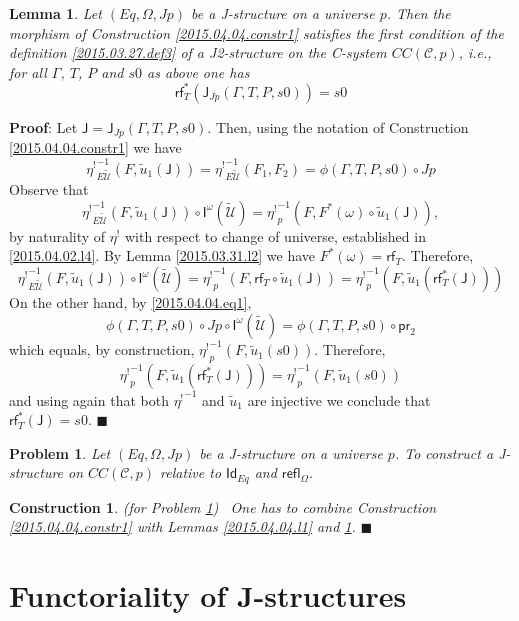 \documentclass[12pt]{article}
\numberwithin{equation}{section}
\newenvironment{myproof}{{\bf Proof}:}{$\blacksquare$ \vskip 5mm }
\newtheorem{lemma}[proposition]{Lemma}
\newtheorem{problem}[proposition]{Problem}
\newtheorem{construction0}[proposition]{Construction}
\newenvironment{construction}[1]{\begin{construction0}(for Problem \ref{#1})\ }{$\blacksquare$ \end{construction0}}
\newcommand{\wt}{\widetilde}
\newcommand{\toCC}{CC} %
\newcommand{\C}{{\mathcal C}}  %
\newcommand{\Id}{\mathsf{Id}} %
\newcommand{\refl}{\mathsf{refl}}
\newcommand{\J}{\mathsf{J}}
\newcommand{\U}{\mathcal{U}}
\newcommand{\I}{\mathsf{I}}
\newcommand{\rf}{\mathsf{rf}}
\newcommand{\etashriek}{\eta^!}
\newcommand{\etaunshriek}{{\etashriek}^{-1}}
\newcommand{\pr}{\mathsf{pr}}
\begin{document}
%
\begin{lemma}
\label{2015.04.04.l5} Let $(Eq,\Omega,Jp)$ be a J-structure on a universe
$p$. Then the morphism of Construction \ref{2015.04.04.constr1} satisfies the
first condition of the definition \ref{2015.03.27.def3} of a J2-structure on the C-system $\toCC({\C},p)$, i.e., for all $\Gamma$,
$T$, $P$ and $s0$ as above one has
%
$$\rf_T^*(\J_{Jp}(\Gamma,T,P,s0))=s0$$
%
\end{lemma}
%
\begin{myproof}
Let $\J=\J_{Jp}(\Gamma,T,P,s0)$. Then, using the notation of Construction
\ref{2015.04.04.constr1} we have
%
$$\etaunshriek_{E\wt{\U}}(F,\wt{u}_1(\J)) = \etaunshriek_{E\wt{\U}}(F_1,F_2) =\phi(\Gamma,T,P,s0)\circ Jp$$
%
Observe that
%
$$\etaunshriek_{E\wt{\U}}(F,\wt{u}_1(\J))\circ
\I^{\omega}(\wt{\U})=\etaunshriek_p(F,F^*(\omega)\circ \wt{u}_1(\J)),$$
by naturality of $\etashriek$ with respect to change of universe, established in \ref{2015.04.02.l4}.
%
By Lemma \ref{2015.03.31.l2} we have $F^*(\omega)=\rf_T$. Therefore,
%
$$\etaunshriek_{E\wt{\U}}(F,\wt{u}_1(\J))\circ \I^{\omega}(\wt{\U})=\etaunshriek_p(F,\rf_T\circ
\wt{u}_1(\J))=\etaunshriek_p(F,\wt{u}_1(\rf_T^*(\J)))$$
%
On the other hand, by \ref{2015.04.04.eq1},
%
$$\phi(\Gamma,T,P,s0) \circ Jp\circ \I^{\omega}(\wt{\U})=\phi(\Gamma,T,P,s0) \circ \pr_2$$
%
which equals, by construction,
$\etaunshriek_p(F,\wt{u}_1(s0))$. Therefore,
%
$$\etaunshriek_p(F,\wt{u}_1(\rf_T^*(\J)))=\etaunshriek_p(F,\wt{u}_1(s0))$$
%
and using again that both $\etaunshriek$ and $\wt{u}_1$ are injective we conclude that
$\rf_T^*(\J)=s0$.
\end{myproof}
%
\begin{problem}
\label{2015.04.04.prob2} Let $(Eq,\Omega,Jp)$ be a J-structure on a universe
$p$. To construct a J-structure on $\toCC({\C},p)$ relative to $\Id_{Eq}$
and $\refl_{\Omega}$.
\end{problem} 
%
\begin{construction}{2015.04.04.prob2}\rm
\label{2015.04.04.constr2} One has to combine Construction
\ref{2015.04.04.constr1} with Lemmas \ref{2015.04.04.l1} and
\ref{2015.04.04.l5}.
\end{construction}
%





\section{Functoriality of J-structures}
\end{document}
